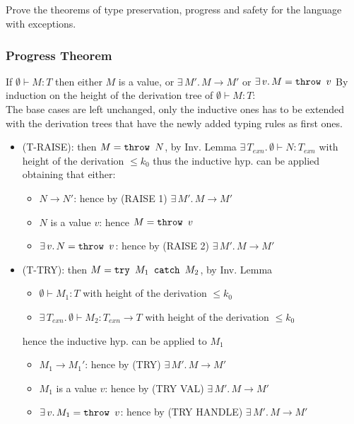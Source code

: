 \subsection{}

Prove the theorems of type preservation, progress and safety for the
language with exceptions.

\subsubsection*{Progress Theorem}

If \(\emptyset \vdash M: T\) then either \(M\) is a value, or
\(\exists\, M'.\, M \to M'\) or \(\exists\, v.\, M = \texttt{throw }v\) By
induction on the height of the derivation tree of \(\emptyset \vdash
M: T\):\\ The base cases are left unchanged, only the inductive ones
has to be extended with the derivation trees that have the newly added
typing rules as first ones.
\begin{itemize}
\item (T-RAISE): then \(M = \texttt{throw }N\), by Inv. Lemma
  \(\exists\, T_{exn}.\, \emptyset \vdash N: T_{exn}\) with
  height of the derivation \(\le k_0\) thus the inductive
  hyp. can be applied obtaining that either:
  \begin{itemize}
  \item \(N \to N'\): hence by (RAISE 1)
    \(\exists\, M'.\, M \to M'\)
  \item \(N\) is a value \(v\): hence \(M =
    \texttt{throw }v\)
  \item \(\exists\, v.\, N = \texttt{throw }v\): hence by
    (RAISE 2) \(\exists\, M'.\, M \to M'\)
  \end{itemize}
\item (T-TRY): then \(M = \texttt{try }M_1\texttt{ catch }M_2\), by Inv. Lemma
  \begin{itemize}
  \item \(\emptyset \vdash M_1: T\) with height of
    the derivation \(\le k_0\)
  \item \(\exists\, T_{exn}.\, \emptyset \vdash
    M_2: T_{exn} \to T\) with height of the
    derivation \(\le k_0\)
  \end{itemize}
  hence the inductive hyp. can be applied to \(M_1\)
  \begin{itemize}
  \item \(M_1 \to M_1'\): hence by (TRY)
    \(\exists\, M'.\, M \to M'\)
  \item \(M_1\) is a value \(v\): hence by (TRY
    VAL) \(\exists\, M'.\, M \to M'\)
  \item \(\exists\, v.\, M_1 = \texttt{throw }v\): hence
    by (TRY HANDLE) \(\exists\, M'.\, M \to M'\)
  \end{itemize}
\end{itemize}

